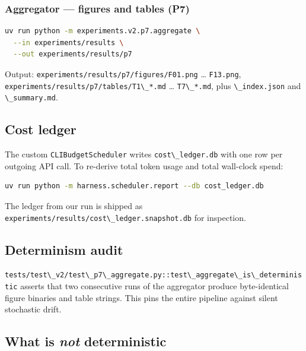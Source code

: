 \subsubsection{Aggregator --- figures and tables (P7)}\label{aggregator-figures-and-tables-p7}

\begin{lstlisting}[language=bash]
uv run python -m experiments.v2.p7.aggregate \
  --in experiments/results \
  --out experiments/results/p7
\end{lstlisting}

Output: \passthrough{\lstinline!experiments/results/p7/figures/F01.png!} \ldots{} \passthrough{\lstinline!F13.png!}, \passthrough{\lstinline!experiments/results/p7/tables/T1\_*.md!} \ldots{} \passthrough{\lstinline!T7\_*.md!}, plus \passthrough{\lstinline!\_index.json!} and \passthrough{\lstinline!\_summary.md!}.

\subsection{Cost ledger}\label{cost-ledger}

The custom \passthrough{\lstinline!CLIBudgetScheduler!} writes \passthrough{\lstinline!cost\_ledger.db!} with one row per outgoing API call. To re-derive total token usage and total wall-clock spend:

\begin{lstlisting}[language=bash]
uv run python -m harness.scheduler.report --db cost_ledger.db
\end{lstlisting}

The ledger from our run is shipped as \passthrough{\lstinline!experiments/results/cost\_ledger.snapshot.db!} for inspection.

\subsection{Determinism audit}\label{determinism-audit}

\passthrough{\lstinline!tests/test\_v2/test\_p7\_aggregate.py::test\_aggregate\_is\_deterministic!} asserts that two consecutive runs of the aggregator produce byte-identical figure binaries and table strings. This pins the entire pipeline against silent stochastic drift.

\subsection{\texorpdfstring{What is \emph{not} deterministic}{What is not deterministic}}\label{what-is-not-deterministic}

